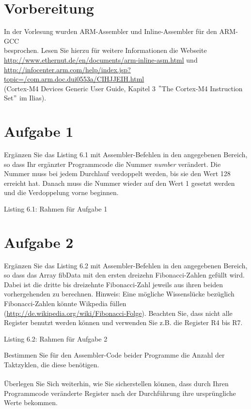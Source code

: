 \newpage
\section{Vorbereitung}
In der Vorlesung wurden ARM-Assembler und Inline-Assembler für den ARM-GCC\\
besprochen. Lesen Sie hierzu für weitere Informationen die Webseite\\
\url{http://www.ethernut.de/en/documents/arm-inline-asm.html} und\\
\url{http://infocenter.arm.com/help/index.jsp?topic=/com.arm.doc.dui0553a/CIHJJEIH.html}\\
(Cortex-M4 Devices Generic User Guide, Kapitel 3 $"$The Cortex-M4 Instruction Set$"$ im Ilias).
\section{Aufgabe 1}
Ergänzen Sie das Listing 6.1 mit Assembler-Befehlen in den angegebenen Bereich, so dass Ihr ergänzter Programmcode die Nummer \textit{number} verändert. Die Nummer muss bei jedem Durchlauf verdoppelt werden, bis sie den Wert 128 erreicht hat. Danach muss die Nummer wieder auf den Wert 1 gesetzt werden und die Verdoppelung vorne beginnen.\\

\begin{center}
	Listing 6.1: Rahmen für Aufgabe 1\\
\end{center}
\section{Aufgabe 2}
Ergänzen Sie das Listing 6.2 mit Assembler-Befehlen in den angegebenen Bereich, so dass das Array fibData mit den ersten dreizehn Fibonacci-Zahlen gefüllt wird. Dabei ist die dritte bis dreizehnte Fibonacci-Zahl jeweils aus ihren beiden vorhergehenden zu berechnen. Hinweis: Eine mögliche Wissenslücke bezüglich Fibonacci-Zahlen könnte Wikpedia füllen (\url{http://de.wikipedia.org/wiki/Fibonacci-Folge}). Beachten Sie, dass nicht alle Register benutzt werden können und verwenden Sie z.B. die Register R4 bis R7.\\

\begin{center}
	Listing 6.2: Rahmen für Aufgabe 2\\
\end{center}
Bestimmen Sie für den Assembler-Code beider Programme die Anzahl der Taktzyklen, die diese benötigen.\\ \\
Überlegen Sie Sich weiterhin, wie Sie sicherstellen können, dass durch Ihren Programmcode veränderte Register nach der Durchführung ihre ursprüngliche Werte bekommen.\\


